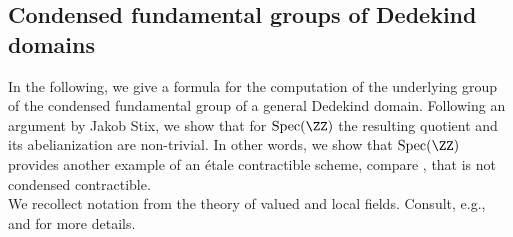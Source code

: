 \documentclass[leqno]{article}
\renewcommand{\Spec}{\mathrm{Spec}}
\begin{document}
\subsection{Condensed fundamental groups of Dedekind domains}
In the following, we give a formula for the computation of the underlying group of the condensed fundamental group of a general Dedekind domain. Following an argument by Jakob Stix, we show that for $\Spec(\ZZ)$ the resulting quotient and its abelianization are non-trivial. In other words, we show that $\Spec(\ZZ)$ provides another example of an \'etale contractible scheme, compare \cite[Example 11.2.2]{Exodromy}, that is not condensed contractible.
\\
\newline
We recollect notation from the theory of valued and local fields. Consult, e.g., \cite{valuedfields} and \cite{Localfields} for more details.
%
\end{document}
